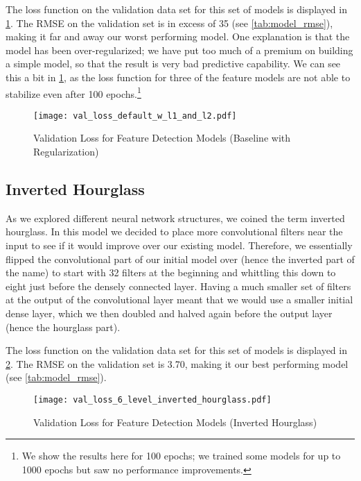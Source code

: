 \documentclass{article}
\begin{document}
The loss function on the validation data set for this set of models is displayed in \ref{fig:val_loss_default_w_l1_and_l2}. The RMSE on the validation set is in excess of 35 (see \ref{tab:model_rmse}), making it far and away our worst performing model. One explanation is that the model has been over-regularized; we have put too much of a premium on building a simple model, so that the result is very bad predictive capability. We can see this a bit in \ref{fig:val_loss_default_w_l1_and_l2}, as the loss function for three of the feature models are not able to stabilize even after 100 epochs.\footnote{We show the results here for 100 epochs; we trained some models for up to 1000 epochs but saw no performance improvements.}

\begin{figure}[!htb]
  \centering
  \caption{Validation Loss for Feature Detection Models (Baseline with Regularization)}
  \texttt{[image: val\_loss\_default\_w\_l1\_and\_l2.pdf]}
  \label{fig:val_loss_default_w_l1_and_l2}
\end{figure}

\subsection{Inverted Hourglass}

As we explored different neural network structures, we coined the term inverted hourglass. In this model we decided to place more convolutional filters near the input to see if it would improve over our existing model.  Therefore, we essentially flipped the convolutional part of our initial model over (hence the inverted part of the name) to start with 32 filters at the beginning and whittling this down to eight just before the densely connected layer.  Having a much smaller set of filters at the output of the convolutional layer meant that we would use a smaller initial dense layer, which we then doubled and halved again before the output layer (hence the hourglass part).

The loss function on the validation data set for this set of models is displayed in \ref{fig:val_loss_6_level_inverted_hourglass}. The RMSE on the validation set is 3.70, making it our best performing model (see \ref{tab:model_rmse}).

\begin{figure}[!htb]
  \centering
  \caption{Validation Loss for Feature Detection Models (Inverted Hourglass)}
  \texttt{[image: val\_loss\_6\_level\_inverted\_hourglass.pdf]}
  \label{fig:val_loss_6_level_inverted_hourglass}
\end{figure}
\end{document}
